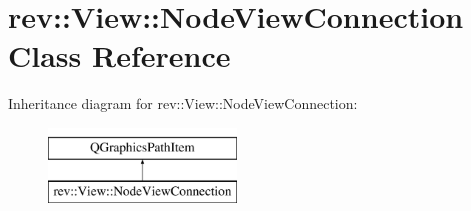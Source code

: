 \hypertarget{classrev_1_1_view_1_1_node_view_connection}{}\section{rev\+::View\+::Node\+View\+Connection Class Reference}
\label{classrev_1_1_view_1_1_node_view_connection}
Inheritance diagram for rev\+::View\+::Node\+View\+Connection\+:\begin{figure}[H]
\begin{center}
\leavevmode
\includegraphics[height=2.000000cm]{classrev_1_1_view_1_1_node_view_connection}
\end{center}
\end{figure}
